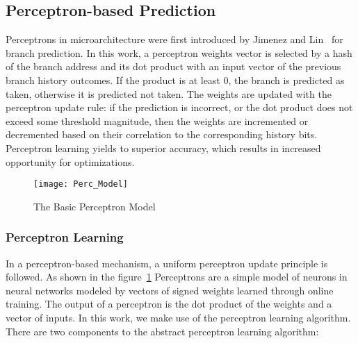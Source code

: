 

\subsection{Perceptron-based Prediction}

Perceptrons in microarchitecture were first introduced by Jimenez and Lin~\cite{Perc_Branch} 
for branch prediction. In this work, a perceptron weights vector is selected by a hash of 
the branch address and its dot product with an input vector of the previous branch history 
outcomes. If the product is at least 0, the branch is predicted as taken, otherwise it is 
predicted not taken. The weights are updated with the perceptron update rule: if the prediction 
is incorrect, or the dot product does not exceed some threshold magnitude, then the weights 
are incremented or decremented based on their correlation to the corresponding history bits. 
Perceptron learning yields to superior accuracy, which results in increased opportunity for 
optimizations.

\begin{figure}[ht]
\texttt{[image: Perc\_Model]}
\caption{The Basic Perceptron Model}
\label{Fig:Perc_Model}
\end{figure}


\subsubsection{Perceptron Learning}

In a perceptron-based mechanism, a uniform perceptron update principle is followed. As
shown in the figure~\ref{Fig:Perc_Model} Perceptrons 
are a simple model of neurons in neural networks \cite{perceptrons1,perceptrons2} modeled by 
vectors of signed weights learned through online training. The output of a perceptron is the 
dot product of the weights and a vector of inputs. In this work, we make use of the perceptron 
learning algorithm. There are two components to the abstract perceptron learning algorithm:

